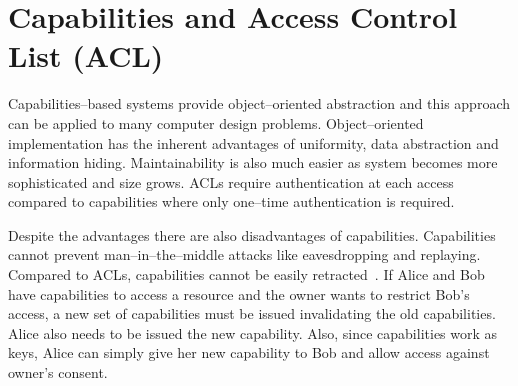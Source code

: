 \documentclass{sig-alternate-10pt}
\begin{document}
\section{Capabilities and Access Control List (ACL)}
Capabilities--based systems provide object--oriented abstraction and this approach can be applied to many computer design problems. Object--oriented implementation has the inherent advantages of uniformity, data abstraction and information hiding. Maintainability is also much easier as system becomes more sophisticated and size grows. ACLs require authentication at each access compared to capabilities where only one--time authentication is required.

Despite the advantages there are also disadvantages of capabilities. Capabilities cannot prevent man--in--the--middle attacks like eavesdropping and replaying. Compared to ACLs, capabilities cannot be easily retracted~\cite{distributed-systems-coulouris}. If Alice and Bob have capabilities to access a resource and the owner wants to restrict Bob's access, a new set of capabilities must be issued invalidating the old capabilities. Alice also needs to be issued the new capability. Also, since capabilities work as keys, Alice can simply give her new capability to Bob and allow access against owner's consent.

\nocite{*}

\end{document}
